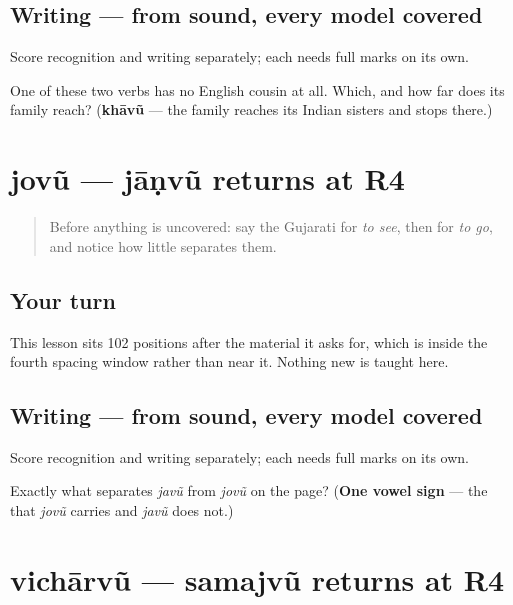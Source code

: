 \subsection*{Writing — from sound, every model covered}
Score recognition and writing separately; each needs full marks on its own.

\begin{tcolorbox}[breakable,colback=teal!4,colframe=teal!35!black,title={Before you move on}]
One of these two verbs has no English cousin at all. Which, and how far does its family reach? (\textbf{khāvũ} — the family reaches its Indian sisters and stops there.)
\end{tcolorbox}
\section[Practice]{jovũ — jāṇvũ returns at R4}

\label{lesson:GU-R26-jovun-jaanvun-r4}



\begin{quote}
Before anything is uncovered: say the Gujarati for \emph{to see}, then for \emph{to go}, and notice how little separates them.
\end{quote}

\subsection*{Your turn}
This lesson sits 102 positions after the material it asks for, which is inside the fourth spacing window rather than near it. Nothing new is taught here.

\subsection*{Writing — from sound, every model covered}
Score recognition and writing separately; each needs full marks on its own.

\begin{tcolorbox}[breakable,colback=teal!4,colframe=teal!35!black,title={Before you move on}]
Exactly what separates \emph{javũ} from \emph{jovũ} on the page? (\textbf{One vowel sign} — the \textbf{} that \emph{jovũ} carries and \emph{javũ} does not.)
\end{tcolorbox}
\section[Practice]{vichārvũ — samajvũ returns at R4}


